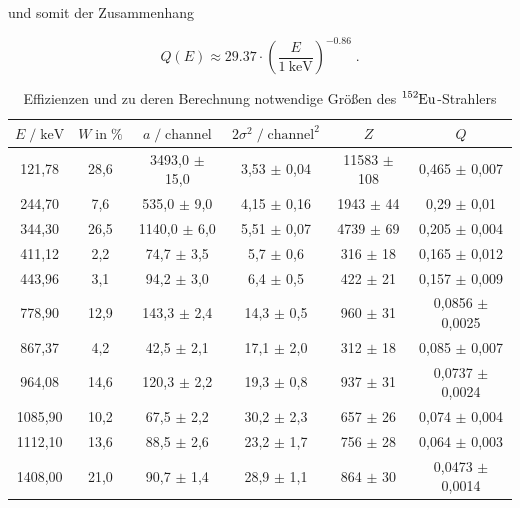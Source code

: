 und somit der Zusammenhang

\begin{equation}
  \label{eqn:eff}
  Q(E) \approx \num{29.37} \cdot (\frac{E}{\SI{1}{\kilo\eV}})^{\num{-0.86}} \; .
\end{equation}

\begin{table}
  \small
  \centering
  \caption{Effizienzen und zu deren Berechnung notwendige Größen des $\ce{^{152}Eu}$-Strahlers}
  \label{tab:mess2}
  \begin{tabular}{c c c c c c}
  \toprule
  $E \;/\; \si{\kilo\eV}$ & $W \;\text{in}\; \si{\percent}$ & $a \;/\; \text{channel}$ & $2\sigma^2 \;/\; \text{channel}^2$ 
  & $Z$ & $Q$ \\
  \midrule
        121,78 & 28,6 & 3493,0 $\pm$ 15,0 &  3,53 $\pm$ 0,04 & 11583 $\pm$ 108 & 0,465  $\pm$ 0,007 \\
        244,70 &  7,6 &  535,0 $\pm$  9,0 &  4,15 $\pm$ 0,16 &  1943 $\pm$  44 & 0,29   $\pm$ 0,01  \\
        344,30 & 26,5 & 1140,0 $\pm$  6,0 &  5,51 $\pm$ 0,07 &  4739 $\pm$  69 & 0,205  $\pm$ 0,004 \\
        411,12 &  2,2 &   74,7 $\pm$  3,5 &  5,7  $\pm$ 0,6  &   316 $\pm$  18 & 0,165  $\pm$ 0,012 \\
        443,96 &  3,1 &   94,2 $\pm$  3,0 &  6,4  $\pm$ 0,5  &   422 $\pm$  21 & 0,157  $\pm$ 0,009 \\
        778,90 & 12,9 &  143,3 $\pm$  2,4 & 14,3  $\pm$ 0,5  &   960 $\pm$  31 & 0,0856 $\pm$ 0,0025\\
        867,37 &  4,2 &   42,5 $\pm$  2,1 & 17,1  $\pm$ 2,0  &   312 $\pm$  18 & 0,085  $\pm$ 0,007 \\
        964,08 & 14,6 &  120,3 $\pm$  2,2 & 19,3  $\pm$ 0,8  &   937 $\pm$  31 & 0,0737 $\pm$ 0,0024\\
       1085,90 & 10,2 &   67,5 $\pm$  2,2 & 30,2  $\pm$ 2,3  &   657 $\pm$  26 & 0,074  $\pm$ 0,004 \\
       1112,10 & 13,6 &   88,5 $\pm$  2,6 & 23,2  $\pm$ 1,7  &   756 $\pm$  28 & 0,064  $\pm$ 0,003 \\
       1408,00 & 21,0 &   90,7 $\pm$  1,4 & 28,9  $\pm$ 1,1  &   864 $\pm$  30 & 0,0473 $\pm$ 0,0014\\
  \bottomrule
  \end{tabular}
  \end{table}


